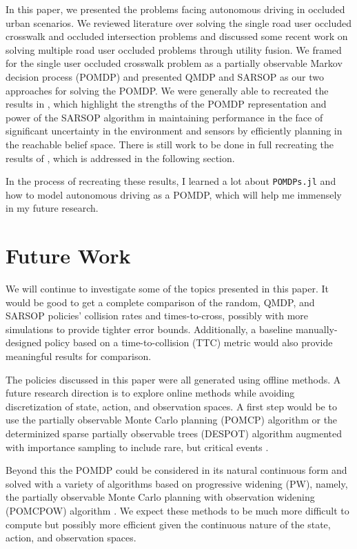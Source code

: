 \documentclass[conference]{IEEEtran}
\begin{document}
In this paper, we presented the problems facing autonomous driving in occluded urban scenarios. We reviewed literature over solving the single road user occluded crosswalk and occluded intersection problems and discussed some recent work on solving multiple road user occluded problems through utility fusion. We framed for the single user occluded crosswalk problem as a partially observable Markov decision process (POMDP) and presented QMDP and SARSOP as our two approaches for solving the POMDP. We were generally able to recreated the results in \cite{Bouton2018ScalableDriving}, which highlight the strengths of the POMDP representation and power of the SARSOP algorithm in maintaining performance in the face of significant uncertainty in the environment and sensors by efficiently planning in the reachable belief space. There is still work to be done in full recreating the results of \cite{Bouton2018ScalableDriving}, which is addressed in the following section.

In the process of recreating these results, I learned a lot about \texttt{POMDPs.jl} and how to model autonomous driving as a POMDP, which will help me immensely in my future research.


\section{Future Work}
\label{sec:future-work}

We will continue to investigate some of the topics presented in this paper. It would be good to get a complete comparison of the random, QMDP, and SARSOP policies' collision rates and times-to-cross, possibly with more simulations to provide tighter error bounds. Additionally, a baseline manually-designed policy based on a time-to-collision (TTC) metric would also provide meaningful results for comparison.

The policies discussed in this paper were all generated using offline methods. A future research direction is to explore online methods while avoiding discretization of state, action, and observation spaces. A first step would be to use the partially observable Monte Carlo planning (POMCP) algorithm \cite{Silver2010Monte-CarloPOMDPs} or the determinized sparse partially observable trees (DESPOT) algorithm augmented with importance sampling to include rare, but critical events \cite{Ye2017DESPOT:Regularization, Luo2019ImportanceUncertainty}. 

Beyond this the POMDP could be considered in its natural continuous form and solved with a variety of algorithms based on progressive widening (PW), namely, the partially observable Monte Carlo planning with observation widening (POMCPOW) algorithm \cite{Sunberg2018OnlineSpaces}. We expect these methods to be much more difficult to compute but possibly more efficient given the continuous nature of the state, action, and observation spaces.
\end{document}
